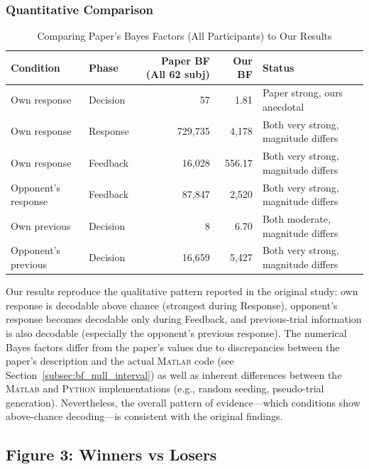 \documentclass[11pt,a4paper]{article}
\newcommand{\thead}[1]{\textbf{\color{white}\sffamily #1}}
\newcommand{\theadrow}{\rowcolor{tabheader}}
\newcommand{\taltrow}{\rowcolor{softgray}}
\newenvironment{styledtable}{%
  \small\sffamily
  \renewcommand{\arraystretch}{1.35}%
}{}
\newcommand{\matlab}{\textsc{Matlab}}
\newcommand{\python}{\textsc{Python}}
\begin{document}
\subsubsection{Quantitative Comparison}

\begin{table}[H]
\centering
\caption{Comparing Paper's Bayes Factors (All Participants) to Our Results}
\label{tab:bf_comparison}
\begin{styledtable}
\begin{tabular}{@{} >{\raggedright\arraybackslash}p{2.6cm} >{\raggedright\arraybackslash}p{1.8cm} r r >{\raggedright\arraybackslash}p{4.2cm} @{}}
\theadrow
\thead{Condition} & \thead{Phase} & \thead{Paper BF (All 62 subj)} & \thead{Our BF} & \thead{Status} \\
\midrule
Own response & Decision & 57 & 1.81 & Paper strong, ours anecdotal \\
\taltrow Own response & Response & 729,735 & 4,178 & Both very strong, magnitude differs \\
Own response & Feedback & 16,028 & 556.17 & Both very strong, magnitude differs \\
\taltrow Opponent's response & Feedback & 87,847 & 2,520 & Both very strong, magnitude differs \\
Own previous & Decision & 8 & 6.70 & Both moderate, magnitude differs \\
\taltrow Opponent's previous & Decision & 16,659 & 5,427 & Both very strong, magnitude differs \\
\bottomrule
\end{tabular}
\end{styledtable}
\end{table}

Our results reproduce the qualitative pattern reported in the original study: own response is decodable above chance (strongest during Response), opponent's response becomes decodable only during Feedback, and previous-trial information is also decodable (especially the opponent's previous response). The numerical Bayes factors differ from the paper's values due to discrepancies between the paper's description and the actual \matlab{} code (see Section~\ref{subsec:bf_null_interval}) as well as inherent differences between the \matlab{} and \python{} implementations (e.g., random seeding, pseudo-trial generation). Nevertheless, the overall pattern of evidence---which conditions show above-chance decoding---is consistent with the original findings.

\subsection{Figure 3: Winners vs Losers}
\label{subsec:fig3}
\end{document}
